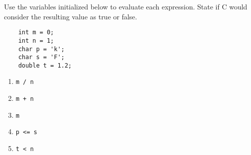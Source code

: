 
\begin{exercise}
Use the variables initialized below to evaluate each expression. State if C would consider the resulting value as true or false.
\begin{verbatim}
    int m = 0;
    int n = 1;
    char p = 'k';
    char s = 'F';
    double t = 1.2;   
\end{verbatim}
\begin{enumerate}
	\item {\tt m / n}
	\item {\tt m + n}
	\item {\tt m}
	\item {\tt p <= s}
	\item {\tt t < n}
\end{enumerate}
\end{exercise}

